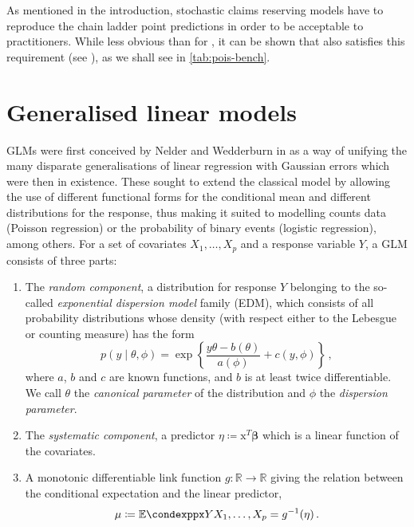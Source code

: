 \documentclass[a4paper]{book}
\begin{document}
As mentioned in the introduction, stochastic claims reserving models have to reproduce the chain ladder point predictions in order to be acceptable to practitioners. While less obvious than for , it can be shown that  also satisfies this requirement (see \cite[Lemma 2.16]{wuthrich:stochastic-reserving}), as we shall see in \cref{tab:pois-bench}.

\section{Generalised linear models} \label{sec:glm}

GLMs were first conceived by Nelder and Wedderburn in \cite{nelder} as a way of unifying the many disparate generalisations of linear regression with Gaussian errors which were then in existence. These sought to extend the classical model by allowing the use of different functional forms for the conditional mean and different distributions for the response, thus making it suited to modelling counts data (Poisson regression) or the probability of binary events (logistic regression), among others. For a set of covariates $X_1, \dots, X_p$ and a response variable $Y$, a GLM consists of three parts:
\begin{enumerate}
  \item The \emph{random component}, a distribution for response $Y$ belonging to the so-called \emph{exponential dispersion model} family (EDM), which consists of all probability distributions whose density (with respect either to the Lebesgue or counting measure) has the form
        \begin{equation} \label{eq:exp-disp-fam}
          p(y \mid \theta, \phi) = \exp \left \{ \frac{y \theta - b(\theta)}{a(\phi)} + c(y, \phi) \right \} \,,
        \end{equation}
        where $a$, $b$ and $c$ are known functions, and $b$ is at least twice differentiable. We call $\theta$ the \emph{canonical parameter} of the distribution and $\phi$ the \emph{dispersion parameter}.
  \item The \emph{systematic component}, a predictor $\eta \coloneqq \bm{\mathrm{x}}^T \bm{\beta}$ which is a linear function of the covariates.
  \item A monotonic differentiable link function $g: \mathbb{R} \rightarrow \mathbb{R}$ giving the relation between the conditional expectation and the linear predictor,
        \begin{equation}
          \mu \coloneqq \condexpp{Y}{X_1, \dots, X_p} = g^{-1}(\eta) \,.
        \end{equation}
\end{enumerate}
\end{document}
